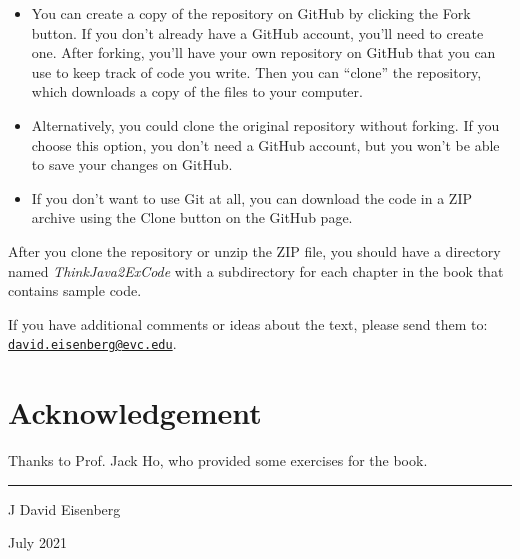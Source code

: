 \begin{itemize}

\item You can create a copy of the repository on GitHub by clicking the {\sf Fork} button.
If you don't already have a GitHub account, you'll need to create one.
After forking, you'll have your own repository on GitHub that you can use to keep track of code you write.
Then you can ``clone'' the repository, which downloads a copy of the files to your computer.

\item Alternatively, you could clone the original repository without forking.
If you choose this option, you don't need a GitHub account, but you won't be able to save your changes on GitHub.

\item If you don't want to use Git at all, you can download the code in a ZIP archive using the {\sf Clone} button on the GitHub page.

\end{itemize}

After you clone the repository or unzip the ZIP file, you should have a directory named {\it ThinkJava2ExCode} with a subdirectory for each chapter in the book that contains sample code.


If you have additional comments or ideas about the text, please send them to: \href{mailto:david.eisenberg@evc.edu}{\tt david.eisenberg@evc.edu}.

\section*{Acknowledgement}
Thanks to Prof. Jack Ho, who provided some exercises for the book.

\rule{\textwidth}{0.1mm}

\hfill J David Eisenberg

\hfill July 2021
